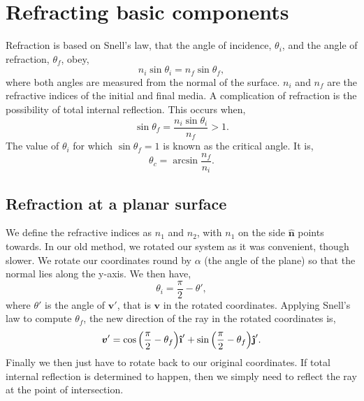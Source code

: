 \documentclass{article}
\let\vec \bm
\newcommand{\uveci}{{\bm{\hat{\textnormal{\bfseries\i}}}}}
\newcommand{\uvecj}{{\bm{\hat{\textnormal{\bfseries\j}}}}}
\begin{document}
\section{Refracting basic components}
Refraction is based on Snell's law, that the angle of incidence, $\theta_i$, and the angle of refraction, $\theta_f$, obey,
\begin{equation}
    n_i \sin \theta_i 
    =
    n_f \sin \theta_f,
\end{equation}
where both angles are measured from the normal of the surface. $n_i$ and $n_f$ are the refractive indices of the initial and final media. A complication of refraction is the possibility of total internal reflection. This occurs when,
\begin{equation}
    \sin \theta_f 
    =
    \frac{n_i \sin \theta_i}{n_f} > 1.
\end{equation}
The value of $\theta_i$ for which $\sin{\theta_f} = 1$ is known as the critical angle. It is,
\begin{equation}
    \theta_c
    =
    \arcsin{\frac{n_f}{n_i}}.
\end{equation}

\subsection{Refraction at a planar surface}
We define the refractive indices as $n_1$ and $n_2$, with $n_1$ on the side $\vec{\hat{n}}$ points towards. In our old method, we rotated our system as it was convenient, though slower. We rotate our coordinates round by $\alpha$ (the angle of the plane) so that the normal lies along the y-axis. We then have,
\begin{equation}
    \theta_i 
    =
    \frac{\pi}{2} - \theta',
\end{equation}
where $\theta'$ is the angle of $\vec{v}'$, that is $\vec v$ in the rotated coordinates. Applying Snell's law to compute $\theta_f$, the new direction of the ray in the rotated coordinates is,
\begin{equation}
    \vec{v}'
    = 
    \cos{
    \left(
        \frac{\pi}{2} - \theta_f
    \right)
    } \uveci'
    +
    \sin{
    \left(
        \frac{\pi}{2} - \theta_f
    \right)
    } \uvecj'.
\end{equation}
Finally we then just have to rotate back to our original coordinates. If total internal reflection is determined to happen, then we simply need to reflect the ray at the point of intersection.
\end{document}
